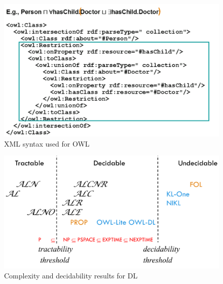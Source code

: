 \begin{figure}
	\includegraphics[width=\textwidth]{Images/owlXML}
	\caption{XML syntax used for OWL}
	\label{img:owlXML}
\end{figure}
\begin{figure}
	\includegraphics[width=\textwidth]{Images/DLresults}
	\caption{Complexity and decidability results for DL}
	\label{img:DLresults}
\end{figure}

